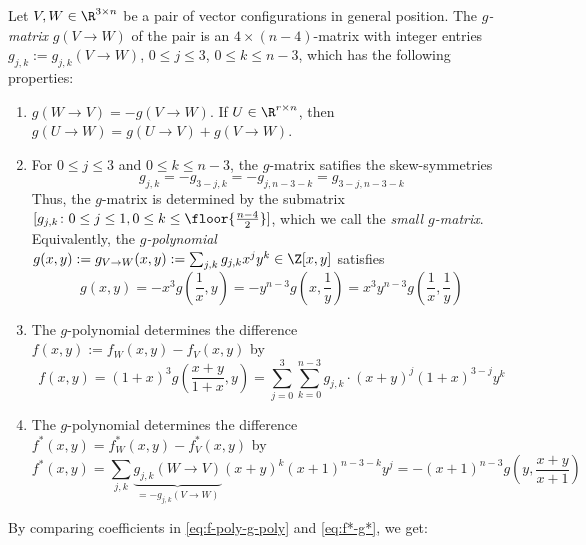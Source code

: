 \begin{theorem} 
\label{thm:f-g}
Let $V,W \in \R^{3\times n}$ be a pair of vector configurations in general position. 
%
The \emph{$g$-matrix} $g(V\to W)$ of the pair is an $4\times (n-4)$-matrix  with integer entries $g_{j,k}:=g_{j,k}(V\to W)$, $0\leq j\leq 3$, $0\leq k \leq n-3$, which has the following properties:  
\begin{enumerate}
\item $g(W\to V)=-g(V\to W)$. If $U\in \R^{r\times n}$, then $g(U\to W)=g(U\to V)+g(V\to W)$. 
\item For $0\leq j\leq 3$ and $0\leq k\leq n-3$, the $g$-matrix satifies the skew-symmetries
\begin{equation}
\label{eq:g-skew}
g_{j,k}=-g_{3-j,k}=-g_{j,n-3-k}=g_{3-j,n-3-k}
\end{equation}
Thus, the $g$-matrix is determined by the submatrix $[g_{j,k}\colon 0\leq j \leq 1, 0\leq k \leq \floor{\frac{n-4}{2}}]$, which we call the \emph{small $g$-matrix}. 
Equivalently, the \emph{$g$-polynomial} $g(x,y):=g_{V\to W}(x,y):=\sum_{j,k} g_{j,k} x^j y^k \in \Z[x,y]$ satisfies
\begin{equation}
\label{eq:g-poly-skew}
\textstyle g(x,y)=-x^3g(\frac{1}{x},y)=-y^{n-3}g(x,\frac{1}{y})=x^3y^{n-3}g(\frac{1}{x},\frac{1}{y})
\end{equation}
\item The $g$-polynomial determines the difference $f(x,y):=f_W(x,y)-f_V(x,y)$ by
\begin{equation}
\label{eq:f-poly-g-poly}
f(x,y) = (1+x)^3 g (\textstyle \frac{x+y}{1+x},y)=\sum_{j=0}^3 \sum_{k=0}^{n-3} g_{j,k}\cdot (x+y)^j (1+x)^{3-j} y^k
\end{equation}
\item The $g$-polynomial determines the difference $f^*(x,y)=f^*_W(x,y)-f^*_V(x,y)$ by
\begin{equation}
\label{eq:f*-g*}
\textstyle f^*(x,y) = \sum_{j,k} \underbrace{g_{j,k}(W \to V)}_{=-g_{j,k}(V \to W)} (x+y)^k (x+1)^{n-3-k} y^j = -(x+1)^{n-3} g(y,\frac{x+y}{x+1})
\end{equation}
%
\end{enumerate}
\end{theorem}
By comparing coefficients in \eqref{eq:f-poly-g-poly} and \eqref{eq:f*-g*}, we get:
